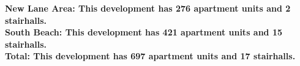 \bf{New Lane Area}: This development has 276 apartment units and 2 stairhalls.\\\bf{South Beach}: This development has 421 apartment units and 15 stairhalls.\\\bf{Total}: This development has 697 apartment units and 17 stairhalls.\\